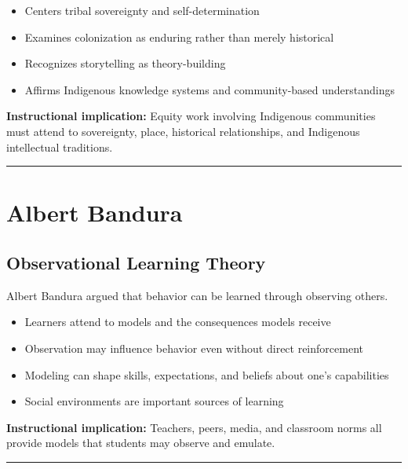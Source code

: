 \documentclass[
  letterpaper,
  DIV=11,
  numbers=noendperiod]{scrartcl}
\providecommand{\tightlist}{%
  \setlength{\itemsep}{0pt}\setlength{\parskip}{0pt}}\usepackage{longtable,booktabs,array}
\begin{document}
\begin{itemize}
\tightlist
\item
  Centers tribal sovereignty and self-determination
\item
  Examines colonization as enduring rather than merely historical
\item
  Recognizes storytelling as theory-building
\item
  Affirms Indigenous knowledge systems and community-based
  understandings
\end{itemize}

\textbf{Instructional implication:} Equity work involving Indigenous
communities must attend to sovereignty, place, historical relationships,
and Indigenous intellectual traditions.

\begin{center}\rule{0.5\linewidth}{0.5pt}\end{center}

\section{Albert Bandura}\label{albert-bandura}

\subsection{Observational Learning
Theory}\label{observational-learning-theory}

Albert Bandura argued that behavior can be learned through observing
others.

\begin{itemize}
\tightlist
\item
  Learners attend to models and the consequences models receive
\item
  Observation may influence behavior even without direct reinforcement
\item
  Modeling can shape skills, expectations, and beliefs about one's
  capabilities
\item
  Social environments are important sources of learning
\end{itemize}

\textbf{Instructional implication:} Teachers, peers, media, and
classroom norms all provide models that students may observe and
emulate.

\begin{center}\rule{0.5\linewidth}{0.5pt}\end{center}
\end{document}
